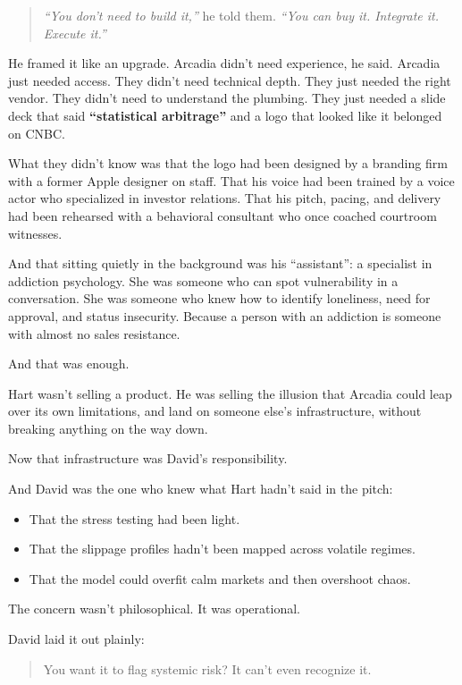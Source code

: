 \begin{quote}
\textit{``You don’t need to build it,''} he told them. \textit{``You can buy it. Integrate it. Execute it.''}
\end{quote}

He framed it like an upgrade.
Arcadia didn’t need experience, he said. Arcadia just needed access.
They didn’t need technical depth. They just needed the right vendor.
They didn’t need to understand the plumbing.
They just needed a slide deck that said \textbf{“statistical arbitrage”} and a logo that looked like it belonged on CNBC.

What they didn’t know 
was that the logo had been designed by a branding firm with a former Apple designer on staff.
That his voice had been trained by a voice actor who specialized in investor relations.
That his pitch, pacing, and delivery had been rehearsed with a behavioral consultant who once coached courtroom witnesses.

And that sitting quietly in the background was his ``assistant'': a specialist in addiction psychology.
She was someone who can spot vulnerability in a conversation.
She was someone who knew how to identify loneliness, need for approval, and status insecurity.
Because a person with an addiction is someone with almost no sales resistance.

And that was enough.

Hart wasn’t selling a product.
He was selling the illusion that Arcadia could leap over its own limitations, and land on someone else’s infrastructure, 
without breaking anything on the way down.

Now that infrastructure was David’s responsibility.

And David was the one who knew what Hart hadn’t said in the pitch:

\begin{itemize}
  \item That the stress testing had been light.
  \item That the slippage profiles hadn’t been mapped across volatile regimes.
  \item That the model could overfit calm markets and then overshoot chaos.
\end{itemize}

The concern wasn’t philosophical. It was operational.

David laid it out plainly:

\begin{quote}
  You want it to flag systemic risk? It can’t even recognize it. 
\end{quote}

